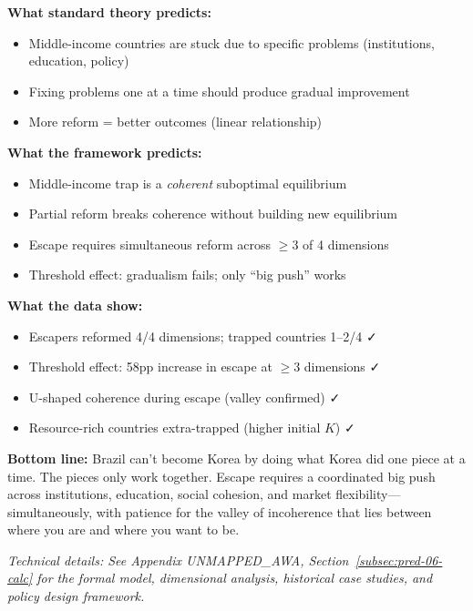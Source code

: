 \begin{tcolorbox}[colback=gray!5!white, colframe=gray!75!black, title=Prediction 6: Coherence Trap]
\textbf{What standard theory predicts:}
\begin{itemize}
    \item Middle-income countries are stuck due to specific problems (institutions, 
    education, policy)
    \item Fixing problems one at a time should produce gradual improvement
    \item More reform = better outcomes (linear relationship)
\end{itemize}

\textbf{What the framework predicts:}
\begin{itemize}
    \item Middle-income trap is a \emph{coherent} suboptimal equilibrium
    \item Partial reform breaks coherence without building new equilibrium
    \item Escape requires simultaneous reform across $\geq 3$ of 4 dimensions
    \item Threshold effect: gradualism fails; only ``big push'' works
\end{itemize}

\textbf{What the data show:}
\begin{itemize}
    \item Escapers reformed 4/4 dimensions; trapped countries 1--2/4 ✓
    \item Threshold effect: 58pp increase in escape at $\geq 3$ dimensions ✓
    \item U-shaped coherence during escape (valley confirmed) ✓
    \item Resource-rich countries extra-trapped (higher initial $K$) ✓
\end{itemize}

\textbf{Bottom line:} Brazil can't become Korea by doing what Korea did 
one piece at a time. The pieces only work together. Escape requires a 
coordinated big push across institutions, education, social cohesion, 
and market flexibility---simultaneously, with patience for the valley 
of incoherence that lies between where you are and where you want to be.
\end{tcolorbox}

\vspace{0.5em}
\noindent\textit{Technical details: See Appendix UNMAPPED_AWA, Section~\ref{subsec:pred-06-calc} for the 
formal model, dimensional analysis, historical case studies, and policy 
design framework.}

